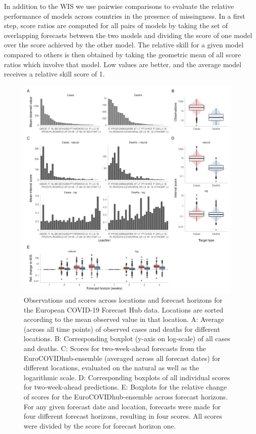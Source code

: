 \documentclass{article}
\begin{document}
In addition to the WIS we use pairwise comparisons \citep{cramerEvaluationIndividualEnsemble2021} to evaluate the relative performance of models across countries in the presence of missingness. In a first step, score ratios are computed for all pairs of models by taking the set of overlapping forecasts between the two models and dividing the score of one model over the score achieved by the other model. The relative skill for a given model compared to others is then obtained by taking the geometric mean of all score ratios which involve that model. Low values are better, and the average model receives a relative skill score of 1. 

\begin{figure}[h!]
    \centering
    \includegraphics[width=0.99\textwidth]{output/figures/HUB-mean-obs-location.png}
    \caption{Observations and scores across locations and forecast horizons for the European COVID-19 Forecast Hub data. Locations are sorted according to the mean observed value in that location. 
    A: Average (across all time points) of observed cases and deaths for different locations. B: Corresponding boxplot (y-axis on log-scale) of all cases and deaths. C: Scores for two-week-ahead forecasts from the EuroCOVIDhub-ensemble (averaged across all forecast dates) for different locations, evaluated on the natural as well as the logarithmic scale. D: Corresponding boxplots of all individual scores for two-week-ahead predictions. E: Boxplots for the relative change of scores for the EuroCOVIDhub-ensemble across forecast horizons. For any given forecast date and location, forecasts were made for four different forecast horizons, resulting in four scores. All scores were divided by the score for forecast horizon one.}
    \label{fig:HUB-mean-locations}
\end{figure}
\end{document}
